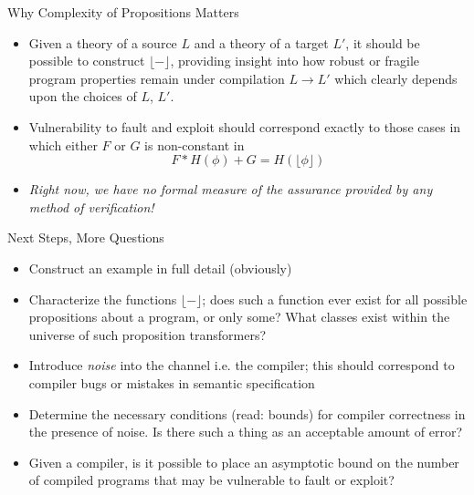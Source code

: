 \documentclass{beamer}
\newcommand{\ptransform}[1]{\ensuremath{\lfloor #1 \rfloor}}
\begin{document}

\begin{frame}{Why Complexity of Propositions Matters}

\begin{itemize}

 \item{
  Given a theory of a source $L$ and a theory of a target $L\prime$, it should
  be possible to construct \ptransform{-}, providing insight into how
  robust or fragile program properties remain under compilation
  $L \rightarrow L\prime$ which clearly depends upon the choices of $L$,
  $L\prime$.
 }

 \item{
  Vulnerability to fault and exploit should correspond exactly to those cases
  in which either $F$ or $G$ is non-constant in
  \[ F * H(\phi) + G = H(\ptransform{\phi}) \]
 }

\item{\emph{Right now, we have no formal measure of the assurance provided by
 any method of verification!}}

\end{itemize}

\end{frame}

\begin{frame}{Next Steps, More Questions}

\begin{itemize}

 \item{Construct an example in full detail (obviously)}

 \item{Characterize the functions \ptransform{-}; does such a function
 ever exist for all possible propositions about a program, or only some?
 What classes exist within the universe of such proposition transformers?}

 \item{Introduce \emph{noise} into the channel i.e. the compiler; this
 should correspond to compiler bugs or mistakes in semantic specification}

 \item{Determine the necessary conditions (read: bounds) for compiler
 correctness in the presence of noise.  Is there such a thing as an acceptable
 amount of error?}

 \item{Given a compiler,
  is it possible to place an asymptotic bound on the number of compiled
  programs that may be vulnerable to fault or exploit?}

\end{itemize}

\end{frame}
\end{document}
